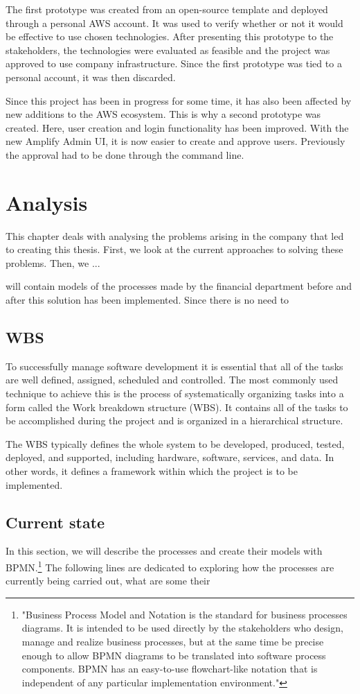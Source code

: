 \documentclass[12pt,oneside]{fithesis2}
\begin{document}
    The first prototype was created from an open-source template and deployed through a personal AWS account. It was used to verify whether or not it would be effective to use chosen technologies. After presenting this prototype to the stakeholders, the technologies were evaluated as feasible and the project was approved to use company infrastructure. Since the first prototype was tied to a personal account, it was then discarded.
    
    Since this project has been in progress for some time, it has also been affected by new additions to the AWS ecosystem. This is why a second prototype was created. Here, user creation and login functionality has been improved. With the new Amplify Admin UI, it is now easier to create and approve users. Previously the approval had to be done through the command line.
    \chapter{Analysis}
    This chapter deals with analysing the problems arising in the company that led to creating this thesis. First, we look at the current approaches to solving these problems. Then, we  ...
    
    will contain models of the processes made by the financial department before and after this solution has been implemented.
    Since there is no need to 
    \section{WBS}
    To successfully manage software development it is essential that all of the tasks are well defined, assigned, scheduled and controlled. The most commonly used technique to achieve this is the process of systematically organizing tasks into a form called the Work breakdown structure (WBS). It contains all of the tasks to be accomplished during the project and is organized in a hierarchical structure.
    \par
    The WBS typically defines the whole system to be developed, produced, tested, deployed, and supported, including hardware, software, services, and data. In other words, it defines a framework within which the project is to be implemented. \cite{systems-engineering}
    \section{Current state}
    In this section, we will describe the processes and create their models with BPMN.\footnote{"Business Process Model and Notation is the standard for business processes diagrams. It is intended to be used directly by the stakeholders who design, manage and realize business processes, but at the same time be precise enough to allow BPMN diagrams to be translated into software process components. BPMN has an easy-to-use flowchart-like notation that is independent of any particular implementation environment."\cite{bpmn}} The following lines are dedicated to exploring how the processes are currently being carried out, what are some their 
\end{document}
